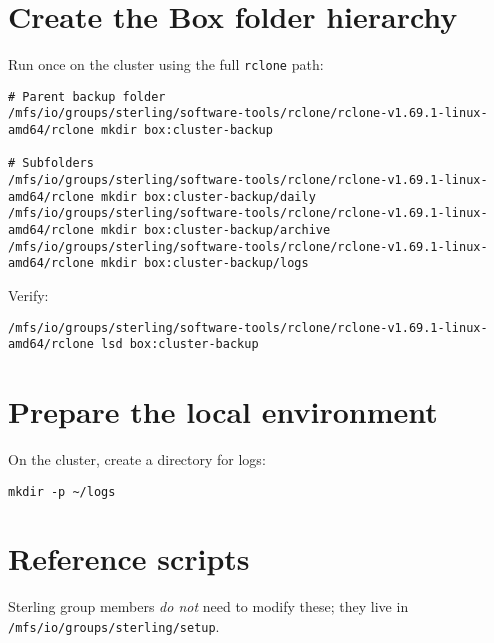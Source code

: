 \documentclass[12pt,letterpaper]{article}
\begin{document}
\section{Create the Box folder hierarchy}
\label{sec:create-hierarchy}
Run once on the cluster using the full \texttt{rclone} path:
\begin{lstlisting}[style=custombash]
# Parent backup folder
/mfs/io/groups/sterling/software-tools/rclone/rclone-v1.69.1-linux-amd64/rclone mkdir box:cluster-backup

# Subfolders
/mfs/io/groups/sterling/software-tools/rclone/rclone-v1.69.1-linux-amd64/rclone mkdir box:cluster-backup/daily
/mfs/io/groups/sterling/software-tools/rclone/rclone-v1.69.1-linux-amd64/rclone mkdir box:cluster-backup/archive
/mfs/io/groups/sterling/software-tools/rclone/rclone-v1.69.1-linux-amd64/rclone mkdir box:cluster-backup/logs
\end{lstlisting}
Verify:
\begin{lstlisting}[style=custombash]
/mfs/io/groups/sterling/software-tools/rclone/rclone-v1.69.1-linux-amd64/rclone lsd box:cluster-backup
\end{lstlisting}

\section{Prepare the local environment}
\label{sec:prepare}
On the cluster, create a directory for logs:
\begin{lstlisting}[style=custombash]
mkdir -p ~/logs
\end{lstlisting}

\section{Reference scripts}
\label{sec:reference-scripts}
Sterling group members \emph{do not} need to modify these; they live in
\verb|/mfs/io/groups/sterling/setup|.
\end{document}

